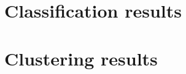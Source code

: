 \label{evaluation}

\section{Classification results}\label{classificationEvaluation}

\section{Clustering results}\label{clusteringEvaluation}